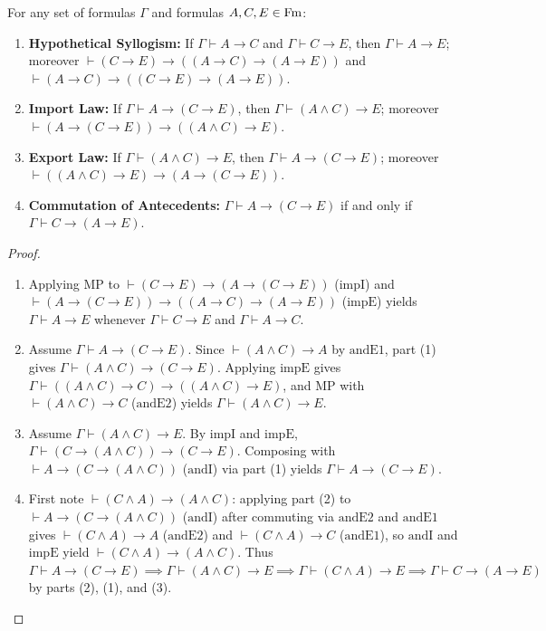 \documentclass[10pt,a4paper]{article}
\renewcommand{\myprf}{\begin{proof}}
\renewcommand{\myqed}{\end{proof}}
\begin{document}
\begin{lemma}\label{lem:import_export}
For any set of formulas $\Gamma$ and formulas $A, C, E \in {\textrm{Fm}}$:
\begin{enumerate}
\item \textbf{Hypothetical Syllogism:} If $\Gamma \vdash A \to C$ and $\Gamma \vdash C \to E$, then $\Gamma \vdash A \to E$; moreover $\vdash (C \to E) \to ((A \to C) \to (A \to E))$ and $\vdash (A \to C) \to ((C \to E) \to (A \to E))$.
\item \textbf{Import Law:} If $\Gamma \vdash A \to (C \to E)$, then $\Gamma \vdash (A \land C) \to E$; moreover $\vdash (A \to (C \to E)) \to ((A \land C) \to E)$.
\item \textbf{Export Law:} If $\Gamma \vdash (A \land C) \to E$, then $\Gamma \vdash A \to (C \to E)$; moreover $\vdash ((A \land C) \to E) \to (A \to (C \to E))$.
\item \textbf{Commutation of Antecedents:} $\Gamma \vdash A \to (C \to E)$ if and only if $\Gamma \vdash C \to (A \to E)$.
\end{enumerate}
\end{lemma}
\myprf
\begin{enumerate}
\item Applying $\textrm{MP}$ to $\vdash (C \to E) \to (A \to (C \to E))$ ($\textrm{impI}$) and $\vdash (A \to (C \to E)) \to ((A \to C) \to (A \to E))$ ($\textrm{impE}$) yields $\Gamma \vdash A \to E$ whenever $\Gamma \vdash C \to E$ and $\Gamma \vdash A \to C$.
\item Assume $\Gamma \vdash A \to (C \to E)$. Since $\vdash (A \land C) \to A$ by $\textrm{andE1}$, part (1) gives $\Gamma \vdash (A \land C) \to (C \to E)$. Applying $\textrm{impE}$ gives $\Gamma \vdash ((A \land C) \to C) \to ((A \land C) \to E)$, and $\textrm{MP}$ with $\vdash (A \land C) \to C$ ($\textrm{andE2}$) yields $\Gamma \vdash (A \land C) \to E$.
\item Assume $\Gamma \vdash (A \land C) \to E$. By $\textrm{impI}$ and $\textrm{impE}$, $\Gamma \vdash (C \to (A \land C)) \to (C \to E)$. Composing with $\vdash A \to (C \to (A \land C))$ ($\textrm{andI}$) via part (1) yields $\Gamma \vdash A \to (C \to E)$.
\item First note $\vdash (C \land A) \to (A \land C)$: applying part (2) to $\vdash A \to (C \to (A \land C))$ ($\textrm{andI}$) after commuting via $\textrm{andE2}$ and $\textrm{andE1}$ gives $\vdash (C \land A) \to A$ ($\textrm{andE2}$) and $\vdash (C \land A) \to C$ ($\textrm{andE1}$), so $\textrm{andI}$ and $\textrm{impE}$ yield $\vdash (C \land A) \to (A \land C)$. Thus $\Gamma \vdash A \to (C \to E) \implies \Gamma \vdash (A \land C) \to E \implies \Gamma \vdash (C \land A) \to E \implies \Gamma \vdash C \to (A \to E)$ by parts (2), (1), and (3).
\end{enumerate}
\myqed
\end{document}

